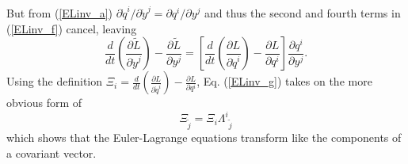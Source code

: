 \documentclass[12pt]{article}
\begin{document}
But from (\ref{ELinv_a}) $ {\partial {\dot q}^i}/{\partial {\dot y}^j} = {\partial q^i}/{\partial y^j}$ and thus the second and
fourth terms in (\ref{ELinv_f}) cancel, leaving
\begin{equation}\label{ELinv_g}
  \frac{d}{dt} \left( \frac{\partial \tilde L}{\partial {\dot y}^j } \right) - \frac{\partial \tilde L}{\partial y^j} = 
  \left[ \frac{d}{d t} \left( \frac{\partial L}{\partial {\dot q}^i} \right) - \frac{\partial L}{\partial q^i} \right] 
  \frac{\partial q^i}{\partial y^j} .
\end{equation}
Using the definition $\Xi_i = \frac{d}{dt}\left(\frac{\partial L}{\partial \dot q^i} \right) - \frac{\partial L}{\partial q^i}$,
Eq. (\ref{ELinv_g}) takes on the more obvious form of
\begin{equation}\label{ELinv_h}
  \Xi_{\tilde j} = \Xi_i {\Lambda^i}_{\tilde j}
\end{equation}
which shows that the Euler-Lagrange equations transform like the components of a covariant vector.
\end{document}
